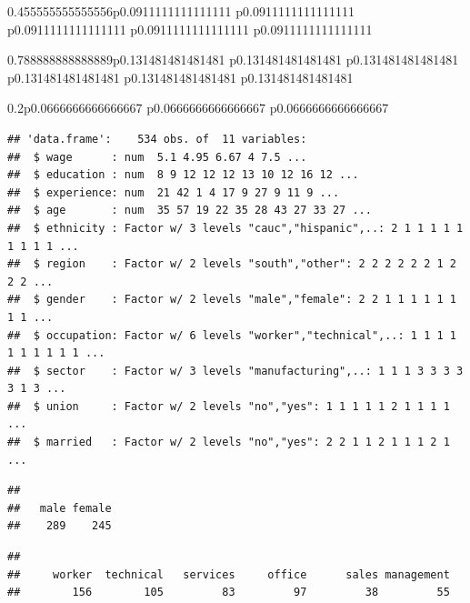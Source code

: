 \documentclass[]{book}
\newenvironment{Shaded}{\begin{snugshade}}{\end{snugshade}}
\newcommand{\CommentTok}[1]{\textcolor[rgb]{0.56,0.35,0.01}{\textit{#1}}}
\newcommand{\KeywordTok}[1]{\textcolor[rgb]{0.13,0.29,0.53}{\textbf{#1}}}
\newcommand{\NormalTok}[1]{#1}
\newcommand{\OperatorTok}[1]{\textcolor[rgb]{0.81,0.36,0.00}{\textbf{#1}}}
\begin{document}
\begin{tabularx}{0.455555555555556\textwidth}{p{} p{} p{} p{} p{}}
\begin{tabularx}{0.788888888888889\textwidth}{p{} p{} p{} p{} p{} p{}}
\begin{tabularx}{0.2\textwidth}{p{} p{} p{}}
\begin{verbatim}
## 'data.frame':    534 obs. of  11 variables:
##  $ wage      : num  5.1 4.95 6.67 4 7.5 ...
##  $ education : num  8 9 12 12 12 13 10 12 16 12 ...
##  $ experience: num  21 42 1 4 17 9 27 9 11 9 ...
##  $ age       : num  35 57 19 22 35 28 43 27 33 27 ...
##  $ ethnicity : Factor w/ 3 levels "cauc","hispanic",..: 2 1 1 1 1 1 1 1 1 1 ...
##  $ region    : Factor w/ 2 levels "south","other": 2 2 2 2 2 2 1 2 2 2 ...
##  $ gender    : Factor w/ 2 levels "male","female": 2 2 1 1 1 1 1 1 1 1 ...
##  $ occupation: Factor w/ 6 levels "worker","technical",..: 1 1 1 1 1 1 1 1 1 1 ...
##  $ sector    : Factor w/ 3 levels "manufacturing",..: 1 1 1 3 3 3 3 3 1 3 ...
##  $ union     : Factor w/ 2 levels "no","yes": 1 1 1 1 1 2 1 1 1 1 ...
##  $ married   : Factor w/ 2 levels "no","yes": 2 2 1 1 2 1 1 1 2 1 ...
\end{verbatim}

\begin{Shaded}
\end{Shaded}

\begin{verbatim}
## 
##   male female 
##    289    245
\end{verbatim}

\begin{Shaded}
\end{Shaded}

\begin{verbatim}
## 
##     worker  technical   services     office      sales management 
##        156        105         83         97         38         55
\end{verbatim}

\begin{Shaded}
\end{Shaded}


\end{tabularx}
\end{tabularx}
\end{tabularx}
\end{document}
